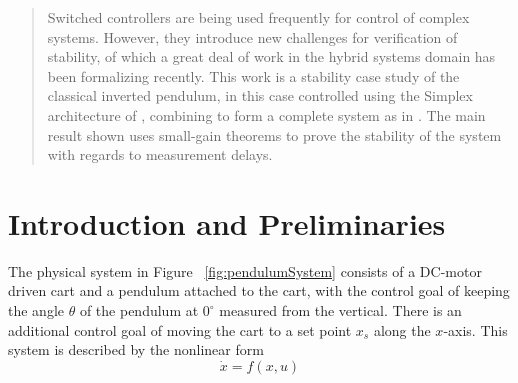 \documentclass[conference]{IEEEtran}
\begin{document}




\maketitle


\begin{abstract}
Switched controllers are being used frequently for control of complex systems.  However, they introduce new challenges for verification of stability, of which a great deal of work in the hybrid systems domain has been formalizing recently.  This work is a stability case study of the classical inverted pendulum, in this case controlled using the Simplex architecture of \cite{ShaACC1998}, combining to form a complete system as in \cite{SetoSha1999}.  The main result shown uses small-gain theorems to prove the stability of the system with regards to measurement delays.
\end{abstract}





%
\IEEEpeerreviewmaketitle



\section{Introduction and Preliminaries}

The physical system in Figure ~\ref{fig:pendulumSystem} consists of a DC-motor driven cart and a pendulum attached to the cart, with the control goal of keeping the angle $\theta$ of the pendulum at $0^{\circ}$ measured from the vertical.  There is an additional control goal of moving the cart to a set point $x_s$ along the $x$-axis.  This system is described by the nonlinear form 
\begin{equation}
\dot{x}=f(x,u)
\label{eq:nonlinearSystem}
\end{equation}
\end{document}
